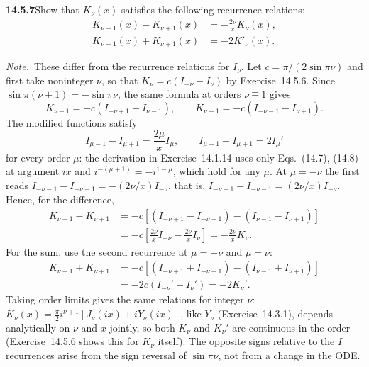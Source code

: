 \par\bigskip
\noindent\textbf{14.5.7}\quad Show that $K_{\nu}(x)$ satisfies the
following recurrence relations:
\begin{align*}
K_{\nu-1}(x)-K_{\nu+1}(x)&=-\frac{2\nu}{x}K_{\nu}(x),\\
K_{\nu-1}(x)+K_{\nu+1}(x)&=-2K'_{\nu}(x).
\end{align*}
\par\emph{Note.}~These differ from the recurrence relations for
$I_{\nu}$.
\solution
Let $c=\pi/(2\sin\pi\nu)$ and first take noninteger $\nu$, so that
$K_\nu=c(I_{-\nu}-I_\nu)$ by Exercise~14.5.6. Since
$\sin\pi(\nu\pm1)=-\sin\pi\nu$, the same formula at orders
$\nu\mp1$ gives
\[
K_{\nu-1}=-c(I_{-\nu+1}-I_{\nu-1}),\qquad
K_{\nu+1}=-c(I_{-\nu-1}-I_{\nu+1}).
\]
The modified functions satisfy
\[
I_{\mu-1}-I_{\mu+1}=\frac{2\mu}xI_\mu,\qquad
I_{\mu-1}+I_{\mu+1}=2I_\mu'
\]
for every order $\mu$: the derivation in Exercise~14.1.14 uses
only Eqs.~(14.7), (14.8) at argument $ix$ and
$i^{-(\mu+1)}=-i^{1-\mu}$, which hold for any $\mu$. At $\mu=-\nu$
the first reads $I_{-\nu-1}-I_{-\nu+1}=-(2\nu/x)I_{-\nu}$, that is,
$I_{-\nu+1}-I_{-\nu-1}=(2\nu/x)I_{-\nu}$. Hence, for the
difference,
\begin{align*}
K_{\nu-1}-K_{\nu+1}
&=-c[(I_{-\nu+1}-I_{-\nu-1})
 -(I_{\nu-1}-I_{\nu+1})]\\
&=-c\left[\frac{2\nu}{x}I_{-\nu}
-\frac{2\nu}{x}I_\nu\right]
=\boxed{-\frac{2\nu}{x}K_\nu}.
\end{align*}
For the sum, use the second recurrence at $\mu=-\nu$ and
$\mu=\nu$:
\begin{align*}
K_{\nu-1}+K_{\nu+1}
&=-c[(I_{-\nu+1}+I_{-\nu-1})
 -(I_{\nu-1}+I_{\nu+1})]\\
&=-2c(I_{-\nu}'-I_\nu')=\boxed{-2K_\nu'}.
\end{align*}
Taking order limits gives the same relations for integer $\nu$:
$K_\nu(x)=\frac\pi2i^{\nu+1}[J_\nu(ix)+iY_\nu(ix)]$, like $Y_\nu$
(Exercise~14.3.1), depends analytically on $\nu$ and $x$ jointly,
so both $K_\nu$ and $K_\nu'$ are continuous in the order
(Exercise~14.5.6 shows this for $K_\nu$ itself).
The opposite signs relative to the $I$ recurrences arise from the
sign reversal of $\sin\pi\nu$, not from a change in the ODE.

